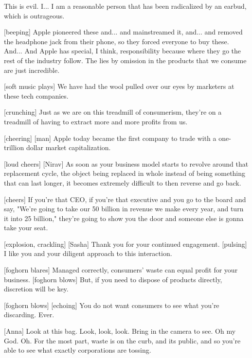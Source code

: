 \documentclass[a4paper]{article}
\begin{document}
	
	
	This is evil.
	I... I am a reasonable person that has been radicalized by an earbud, which is outrageous.
	
	
	
	[beeping]
	Apple pioneered these and... and mainstreamed it, and... and removed the headphone jack from their phone, so they forced everyone to buy these.
	And... And Apple has special, I think, responsibility because where they go the rest of the industry follow.
	The lies by omission in the products that we consume are just incredible.
	
	
	
	[soft music plays]
	We have had the wool pulled over our eyes by marketers at these tech companies.
	
	
	[crunching]
	Just as we are on this treadmill of consumerism, they're on a treadmill of having to extract more and more profits from us.
	
	
	[cheering]
	[man] Apple today became the first company to trade with a one-trillion dollar market capitalization.
	
	[loud cheers]
	[Nirav] As soon as your business model starts to revolve around that replacement cycle, the object being replaced in whole instead of being something that can last longer, it becomes extremely difficult to then reverse and go back.
	
	
	[cheers]
	If you're that CEO, if you're that executive and you go to the board and say, "We're going to take our 50 billion in revenue we make every year, and turn it into 25 billion," they're going to show you the door and someone else is gonna take your seat.
	
	
	[explosion, crackling]
	[Sasha] Thank you for your continued engagement.
	[pulsing]
	I like you and your diligent approach to this interaction.
	
	
	[foghorn blares]
	Managed correctly, consumers' waste can equal profit for your business.
	[foghorn blows]
	But, if you need to dispose of products directly, discretion will be key.
	
	
	
	[foghorn blows]
	[echoing] You do not want consumers to see what you're discarding. Ever.
	
	
	[Anna] Look at this bag.
	Look, look, look.
	Bring in the camera to see.
	Oh my God. Oh.
	For the most part, waste is on the curb, and its public, and so you're able to see what exactly corporations are tossing.
	
	
	
\end{document}
